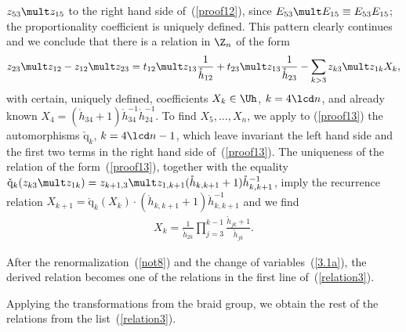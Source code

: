 \documentclass[pdftex]{sigma}
\def\nplus{\mathfrak{n}}\def\nn{\nonumber}\def\nin{\noindent}
\def\q{\check{\mathrm q}}\def\Q{\mathrm{Q}}\def\r#1{(\ref{#1})}\let\rf=\r
\def\s{z}\def\S{\mathrm {S}}\def\si{\sigma}\def\Sp{\S^{\nplus}}\def\sy{\acute{\sigma}}\def\th{\mathring{h}}
\numberwithin{equation}{section}
\begin{document}
$\s_{53}\mult\s_{15}$ to the right hand side of~\rf{proof12}, since $E_{53}\mult E_{15}\equiv E_{53}E_{15}$;
the proportionality coef\/f\/icient is uniquely def\/ined.
This pattern clearly continues and we conclude that there is a relation in $\Z_n$ of the form
\begin{gather}\label{proof13}
\s_{23}\mult\s_{12}-\s_{12}\mult\s_{23}=t_{12}\mult\s_{13} \frac{1}{\th_{12}}+t_{23}\mult\s_{13}\frac{1}{\th_{23}}-
\sum_{k>3}\s_{k3}\mult\s_{1k}X_k  ,
\end{gather}
with certain, uniquely def\/ined, coef\/f\/icients $X_k\in\Uh$, $k=4\lcd n$, and already known $X_4=(\th_{34}+1)
{\th_{34}^{-1}\th_{24}^{-1}}$. To f\/ind $X_5,\dots ,X_n$, we apply to \rf{proof13} the
automorphisms $\q_k$, $k=4\lcd n-1$, which leave invariant the left hand side and the f\/irst two terms in the
right hand side of~\rf{proof13}. The uniqueness of the relation of the form~\rf{proof13}, together with the equality
$\q_k(\s_{k3}\mult\s_{1k})=\s_{k+1,3}\mult\s_{1,k+1}(\th_{k,k+1}+1)\th_{k,k+1}^{-1}$, imply the recurrence relation
$X_{k+1}=\q_k(X_k)\cdot(\th_{k,k+1}+1)\th_{k,k+1}^{-1}$ and we f\/ind
\begin{gather*}%
X_k=\frac{1}{\th_{2k}}\prod_{j=3}^{k-1}\frac{\th_{jk}+1}{\th_{jk}}  .
\end{gather*}

After the renormalization~\rf{not8} and the change of variables~\rf{3.1a}, the derived relation becomes one of the
relations in the f\/irst line of~\rf{relation3}.


Applying the transformations from the braid group, we obtain the rest of the relations from the list~\rf{relation3}.
\end{document}
